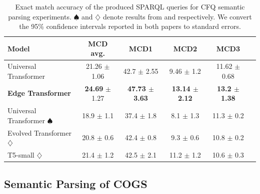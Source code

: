 \documentclass{article}
\begin{document}
\begin{table}[t] 
\small
\centering
\caption{Exact match accuracy of the produced SPARQL queries for CFQ semantic parsing experiments. $\spadesuit$ and $\diamondsuit$ denote results from \citep{keysers_measuring_2020} and \citep{furrer_compositional_2020} respectively. We convert the 95\% confidence intervals reported in both papers to standard errors. \label{tbl:cfq_sem}}
\begin{tabular}{lccccc}
\toprule
Model           & MCD avg. & MCD1 & MCD2 & MCD3 \\
\midrule
Universal Transformer          
& 21.26 $\pm$ 1.06 
& 42.7 $\pm$ 2.55 
& 9.46 $\pm$ 1.2
& 11.62 $\pm$ 0.68   \\  
\textbf{Edge Transformer}
& \textbf{24.69} $\pm$ 1.27 
& \textbf{47.73 $\pm$ 3.63}
& \textbf{13.14 $\pm$ 2.12}
& \textbf{13.2 $\pm$ 1.38}  \\    
Universal Transformer $\spadesuit$
& 18.9 $\pm$ 1.1  
& 37.4 $\pm$ 1.8
& 8.1 $\pm$ 1.3
& 11.3 $\pm$ 0.2   \\
Evolved Transformer $\diamondsuit$
& 20.8 $\pm$ 0.6 
& 42.4 $\pm$ 0.8 
& 9.3 $\pm$ 0.6
& 10.8 $\pm$ 0.2   \\
T5-small $\diamondsuit$
& 21.4 $\pm$ 1.2 
& 42.5 $\pm$ 2.1
& 11.2 $\pm$ 1.2
& 10.6 $\pm$ 0.3   \\ 
\bottomrule
\end{tabular}
\end{table}

\subsection{Semantic Parsing of COGS}
\end{document}
